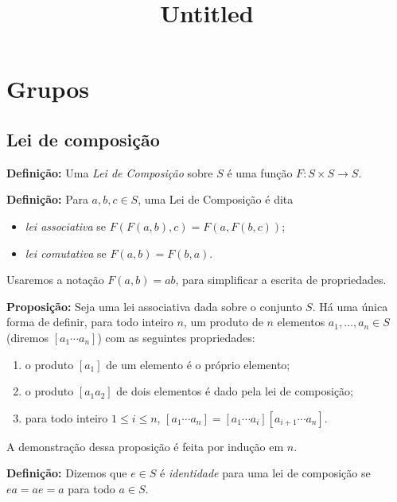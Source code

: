 \documentclass[11pt]{article}
\title{Untitled}
\providecommand{\tightlist}{%
      \setlength{\itemsep}{0pt}\setlength{\parskip}{0pt}}
\begin{document}
    
    \maketitle
    
    

    
    \hypertarget{grupos}{%
\section{Grupos}\label{grupos}}

\hypertarget{lei-de-composiuxe7uxe3o}{%
\subsection{Lei de composição}\label{lei-de-composiuxe7uxe3o}}

\textbf{Definição:} Uma \emph{Lei de Composição} sobre \(S\) é uma
função \(F: S\times S \longrightarrow S\).

\textbf{Definição:} Para \(a,b,c\in S\), uma Lei de Composição é dita

\begin{itemize}
\tightlist
\item
  \emph{lei associativa} se \(F(F(a,b),c) = F(a,F(b,c))\);
\item
  \emph{lei comutativa} se \(F(a,b) = F(b,a)\).
\end{itemize}

Usaremos a notação \(F(a,b) = ab\), para simplificar a escrita de
propriedades.

\textbf{Proposição:} Seja uma lei associativa dada sobre o conjunto
\(S\). Há uma única forma de definir, para todo inteiro \(n\), um
produto de \(n\) elementos \(a_1,\dots,a_n \in S\) (diremos
\([a_1\dotsb a_n]\)) com as seguintes propriedades:

\begin{enumerate}
\def\labelenumi{\arabic{enumi}.}
\tightlist
\item
  o produto \([a_1]\) de um elemento é o próprio elemento;
\item
  o produto \([a_1a_2]\) de dois elementos é dado pela lei de
  composição;
\item
  para todo inteiro \(1\leq i\leq n\),
  \([a_1\dotsb a_n] = [a_1\dotsb a_i][a_{i+1}\dotsb a_n]\).
\end{enumerate}

A demonstração dessa proposição é feita por indução em \(n\).

\textbf{Definição:} Dizemos que \(e\in S\) é \emph{identidade} para uma
lei de composição se \(ea = ae = a\) para todo \(a\in S\).
\end{document}
